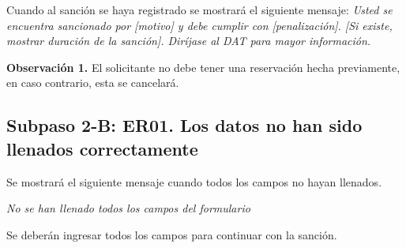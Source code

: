 	Cuando al sanción se haya registrado se mostrará el siguiente mensaje:
	\textit{Usted se encuentra sancionado por [motivo] y debe cumplir con 
	[penalización]. [Si existe, mostrar duración de la sanción]. Diríjase al DAT 
	para mayor información. }
	
	\textbf{Observación 1.} El solicitante no debe tener 
		una reservación hecha previamente, en caso contrario, 
		esta se cancelará.
	
\subsection{Subpaso 2-B: ER01. Los datos no han sido llenados correctamente}
	Se mostrará el siguiente mensaje cuando todos los campos no hayan
	llenados. \par	
	\textit{No se han llenado todos los campos del formulario}\par
	Se deberán ingresar todos los campos para continuar con la sanción.
	
	
	